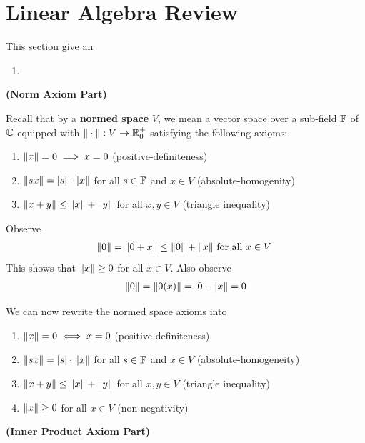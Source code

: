 \documentclass{report}
\begin{document}
\section{Linear Algebra Review}
\begin{mdframed}
This section give an 
\begin{enumerate}[label=(\alph*)]
  \item 
\end{enumerate}
\end{mdframed}
\textbf{(Norm Axiom Part)}
\begin{mdframed}
Recall that by a \textbf{normed space} $V$, we mean a vector space over a sub-field $\mathbb{F}$ of $\mathbb{C}$ equipped with  $\| \cdot \|:V\to \mathbb{R}_0^+$ satisfying the following $\underline{\text{axioms}}$: 
\begin{enumerate}[label=(\alph*)]
  \item $\| x \|=0 \implies x=0$ (positive-definiteness)
  \item $\| sx \|=\left|s\right|\cdot \| x \|$ for all $s \in \mathbb{F}$ and $x\in V$ (absolute-homogenity)
  \item $\| x+y \|\leq \| x \|+\| y \|$ for all $x,y \in V$ (triangle inequality)
\end{enumerate}
Observe
\begin{align*}
\| 0 \|=\| 0+x \|\leq \| 0 \|+\| x \|\text{ for all $x\in V$ }
\end{align*}
This shows that $\| x \|\geq 0$ for all $x\in V$. Also observe 
\begin{align*}
\| 0 \|=\| 0(x) \|=\left|0\right|\cdot \| x \|=0
\end{align*}

We can now rewrite the normed space axioms into
\begin{enumerate}[label=(\alph*)]
  \item $\| x \|=0\iff x=0$ (positive-definiteness)
  \item $\| sx \|=\left|s\right|\cdot \| x \|$ for all $s \in \mathbb{F}$ and $x\in V$ (absolute-homogeneity)
  \item $\| x+y \|\leq \| x \|+\| y \|$ for all $x,y \in V$ (triangle inequality)
  \item $\| x \|\geq 0$ for all $x \in V$ (non-negativity)
\end{enumerate}
\end{mdframed}
\textbf{(Inner Product Axiom Part)}
\end{document}
